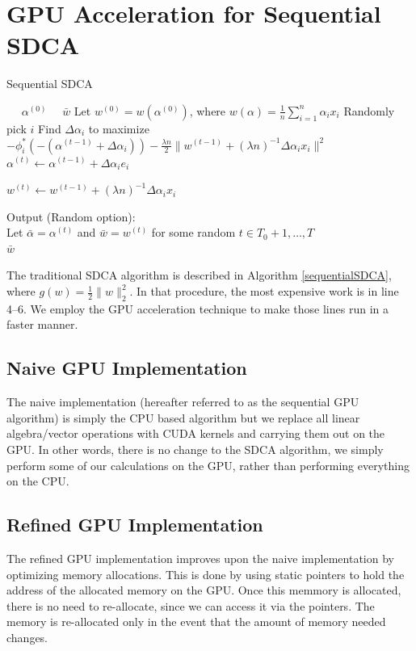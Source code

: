 \documentclass{article}
\begin{document}
\section{GPU Acceleration for Sequential SDCA}
\begin{algorithm}[H]
	\caption{Sequential SDCA}
	\label{sequentialSDCA}
	\begin{algorithmic}[1]
	\REQUIRE~~ $\alpha^{(0)}$
		\ENSURE~~$\bar{w}$
		\STATE Let $w^{(0)}=w(\alpha^{(0)})$, where $w(\alpha)=\frac{1}{n}\sum_{i=1}^{n}\alpha_ix_i$
		\STATE Randomly pick $i$
		\STATE Find $\Delta\alpha_i$ to maximize $-\phi_i^*(-(\alpha^{(t-1)}+\Delta\alpha_i))-\frac{\lambda n}{2}\|w^{(t-1)}+(\lambda n)^{-1}\Delta \alpha_i x_i\|^2$
		\STATE $\alpha^{(t)}\leftarrow\alpha^{(t-1)}+\Delta\alpha_ie_i$
		
		\STATE $w^{(t)}\leftarrow w^{(t-1)}+(\lambda n)^{-1}\Delta\alpha_i x_i$
		\ENDFOR
		
		\STATE Output (Random option):\\
		Let $\bar{\alpha}=\alpha^{(t)}$ and $\bar{w}=w^{(t)}$ for some random $t\in T_0+1,\ldots,T$\\
		\RETURN $\bar{w}$
		
	\end{algorithmic}
\end{algorithm}
The traditional SDCA algorithm \cite{shalev2013stochastic} is described in Algorithm \ref{sequentialSDCA}, where $g(w)=\frac{1}{2}\|w\|_2^2$.
In that procedure, the most expensive work is in line 4--6. We employ the GPU acceleration technique to make those lines run in a faster manner.
\subsection{Naive GPU Implementation}
The naive implementation (hereafter referred to as the sequential GPU algorithm)
is simply the CPU based algorithm but we replace all linear algebra/vector
operations with CUDA kernels and carrying them out on the GPU. In other words,
there is no change to the SDCA algorithm, we simply perform some of our
calculations on the GPU, rather than performing everything on the CPU.

\subsection{Refined GPU Implementation}
The refined GPU implementation improves upon the naive implementation by
optimizing memory allocations. This is done by using static pointers to hold the
address of the allocated memory on the GPU. Once this memmory is allocated,
there is no need to re-allocate, since we can access it via the pointers. The
memory is re-allocated only in the event that the amount of memory needed
changes.
\end{document}
